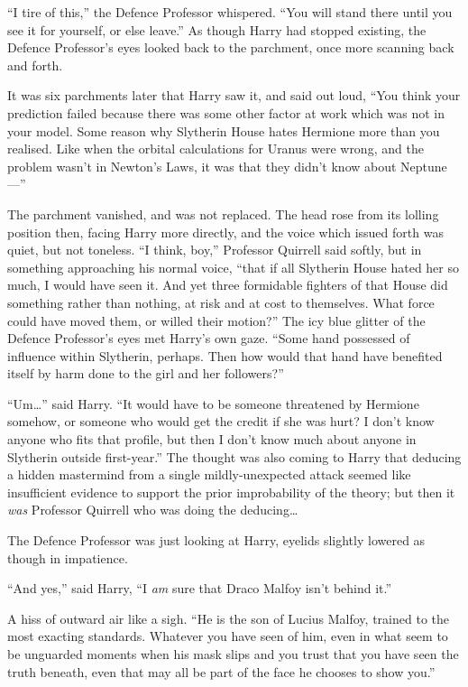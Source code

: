 ``I tire of this,'' the Defence Professor whispered. ``You will stand
there until you see it for yourself, or else leave.'' As though Harry
had stopped existing, the Defence Professor's eyes looked back to the
parchment, once more scanning back and forth.

It was six parchments later that Harry saw it, and said out loud, ``You
think your prediction failed because there was some other factor at work
which was not in your model. Some reason why Slytherin House hates
Hermione more than you realised. Like when the orbital calculations for
Uranus were wrong, and the problem wasn't in Newton's Laws, it was that
they didn't know about Neptune---''

The parchment vanished, and was not replaced. The head rose from its
lolling position then, facing Harry more directly, and the voice which
issued forth was quiet, but not toneless. ``I think, boy,'' Professor
Quirrell said softly, but in something approaching his normal voice,
``that if all Slytherin House hated her so much, I would have seen it.
And yet three formidable fighters of that House did something rather
than nothing, at risk and at cost to themselves. What force could have
moved them, or willed their motion?'' The icy blue glitter of the
Defence Professor's eyes met Harry's own gaze. ``Some hand possessed of
influence within Slytherin, perhaps. Then how would that hand have
benefited itself by harm done to the girl and her followers?''

``Um\ldots{}'' said Harry. ``It would have to be someone threatened by
Hermione somehow, or someone who would get the credit if she was hurt? I
don't know anyone who fits that profile, but then I don't know much
about anyone in Slytherin outside first-year.'' The thought was also
coming to Harry that deducing a hidden mastermind from a single
mildly-unexpected attack seemed like insufficient evidence to support
the prior improbability of the theory; but then it \emph{was} Professor
Quirrell who was doing the deducing\ldots{}

The Defence Professor was just looking at Harry, eyelids slightly
lowered as though in impatience.

``And yes,'' said Harry, ``I \emph{am} sure that Draco Malfoy isn't
behind it.''

A hiss of outward air like a sigh. ``He is the son of Lucius Malfoy,
trained to the most exacting standards. Whatever you have seen of him,
even in what seem to be unguarded moments when his mask slips and you
trust that you have seen the truth beneath, even that may all be part of
the face he chooses to show you.''

